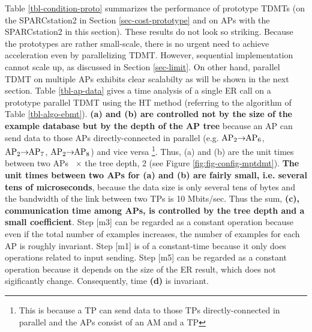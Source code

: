 Table \ref{tbl-condition-proto} summarizes the performance of prototype TDMTs 
(on the SPARCstation2 in Section \ref{sec-cost-prototype} and 
on APs with the SPARCstation2
in this section).
These results do not look so striking.
Because the prototypes are rather small-scale, there is no urgent need 
to achieve acceleration even by parallelizing TDMT.
However, sequential implementation cannot scale up,
as discussed in Section \ref{sec-limit}.
On other hand, parallel TDMT 
on multiple APs exhibits clear scalabilty as will be shown in the
next section.
Table \ref{tbl-ap-data} gives a time analysis of a single ER call on a 
prototype 
parallel TDMT using the HT 
method (referring to the algorithm of Table \ref{tbl-algo-ebmt}).
{\bf (a) and (b) are controlled not by the size of the example database
but by the depth of the AP tree}
because an AP can send data to those APs directly-connected in parallel 
(e.g.  {\small 
 $\rm AP_2\hspace{-0.3em}\to\hspace{-0.3em}{AP_6}$,
 $\rm AP_2\hspace{-0.3em}\to\hspace{-0.3em}{AP_7}$,
 $\rm AP_2\hspace{-0.3em}\to\hspace{-0.3em}{AP_8}$})
 and vice versa
\footnote{
This is because a TP can send data to those TPs directly-connected in parallel 
and the APs consist of an AM and a TP}.
Thus, (a) and (b) are the unit times between two APs ~$\times$ 
the tree depth, 2 (see Figure \ref{fig:fig-config-mptdmt}).
{\bf The unit times between two APs for (a) and (b) are fairly small, 
i.e.  several tens of microseconds}, 
because the data size is only several tens of  bytes 
and the bandwidth of the link between two TPs is 10 Mbits/sec.
Thus the sum, {\bf (c), communication time among APs, is controlled 
by the tree depth and a small coefficient}.
Step [m3] can be regarded as a constant operation because 
even if the total number of 
examples increases, the number of examples for  each AP
is  roughly invariant.
Step [m1] is of a constant-time because it only does 
operations related to input sending. 
Step [m5] can be regarded as a constant operation
because it depends on the size of the 
ER result, which does not sigificantly change.
Consequently, time {\bf (d)} is invariant.

